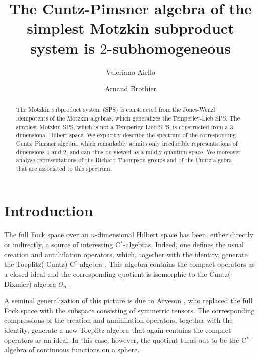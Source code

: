 \documentclass[12pt, a4paper]{amsart}
\numberwithin{equation}{section}
\begin{document}
 
 \title[The simplest Motzkin subproduct]{The Cuntz-Pimsner algebra of the simplest Motzkin subproduct system is $2$-subhomogeneous}
\author{Valeriano Aiello} 
\address{Valeriano Aiello, Dipartimento di Matematica, Universit\`a di Roma La Sapienza, P.le Aldo Moro 5, 00185 Roma, Italy %
}
\author{Arnaud Brothier} 
\address{Arnaud Brothier,  University of Trieste, Department of Mathematics,
via Valerio 12/1, 34127, Trieste, Italy and School of Mathematics and
Statistics, University of New South Wales, Sydney NSW 2052, Australia, 
\url{https://sites.google.com/site/arnaudbrothier/}
}

\begin{abstract} 
The Motzkin subproduct system (SPS) is 
 constructed from the Jones-Wenzl idempotents of the Motzkin algebras, which generalizes  the Temperley-Lieb SPS.
The simplest  Motzkin SPS, which is not a Temperley-Lieb SPS, is constructed from a $3$-dimensional Hilbert space.
We explicitly describe the spectrum of the corresponding Cuntz–Pimsner algebra, which remarkably admits only irreducible representations of dimensions \(1\) and \(2\), and can thus be viewed as a mildly quantum space.
We moreover analyse representations of the Richard Thompson groups and of the Cuntz algebra that are associated to this spectrum.
\end{abstract}


\maketitle

\section*{Introduction}

The full Fock space over an \(n\)-dimensional Hilbert space has been, either directly or indirectly, a source of interesting   C\(^*\)-algebras. 
Indeed, one defines the usual creation and annihilation operators, which, together with the identity, generate the Toeplitz(-Cuntz) C\(^*\)-algebra \cite{Cuntz}.
This algebra contains the compact operators as a closed ideal and the corresponding quotient is isomorphic to the Cuntz(-Dixmier) algebra \(\mathcal{O}_n\) \cite{Dixmier64,Cuntz}.

A seminal generalization of this picture is due to Arveson \cite{Arveson98}, who replaced the full Fock space with the subspace consisting of symmetric tensors. 
The corresponding compressions of the creation and annihilation operators, together with the identity, generate a new Toeplitz algebra that again contains the compact operators as an ideal. In this case, however, the quotient  turns out to be the C\(^*\)-algebra of continuous functions on a sphere.
\end{document}
